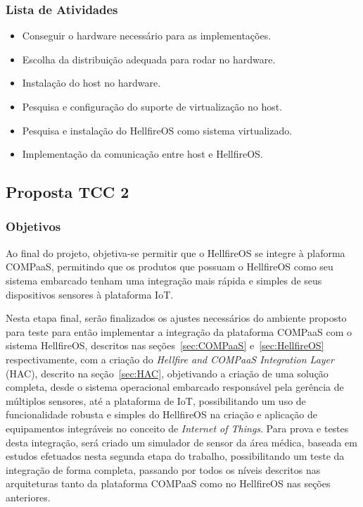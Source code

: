 \subsubsection{Lista de Atividades}
\begin{itemize}
\item Conseguir o hardware necessário para as implementações.
\item Escolha da distribuição adequada para rodar no hardware.
\item Instalação do host no hardware.
\item Pesquisa e configuração do suporte de virtualização no host.
\item Pesquisa e instalação do HellfireOS como sistema virtualizado.
\item Implementação da comunicação entre host e HellfireOS.
\end{itemize}

\subsection{Proposta TCC 2}
\subsubsection{Objetivos}
\label{sec:objetivos_2}
Ao final do projeto, objetiva-se permitir que o HellfireOS se integre à plaforma COMPaaS,
permitindo que os produtos que possuam o HellfireOS como seu sistema embarcado tenham
uma integração mais rápida e simples de seus dispositivos sensores à plataforma IoT.

Nesta etapa final, serão finalizados os ajustes necessários do ambiente proposto para teste
para então implementar a integração da plataforma COMPaaS com o sistema HellfireOS,
descritos nas seções~\ref{sec:COMPaaS} e~\ref{sec:HellfireOS} respectivamente, com a criação
do \textit{Hellfire and COMPaaS Integration Layer} (HAC), descrito na seção~\ref{sec:HAC},
objetivando a criação de uma solução completa, desde o sistema operacional embarcado
responsável pela gerência de múltiplos sensores, até a plataforma de IoT, possibilitando
um uso de funcionalidade robusta e simples do HellfireOS na criação e aplicação de
equipamentos integráveis no conceito de \textit{Internet of Things}.
Para prova e testes desta integração, será criado um simulador de sensor da área médica,
baseada em estudos efetuados nesta segunda etapa do trabalho, possibilitando um teste
da integração de forma completa, passando por todos os níveis descritos nas arquiteturas
tanto da plataforma COMPaaS como no HellfireOS nas seções anteriores.

